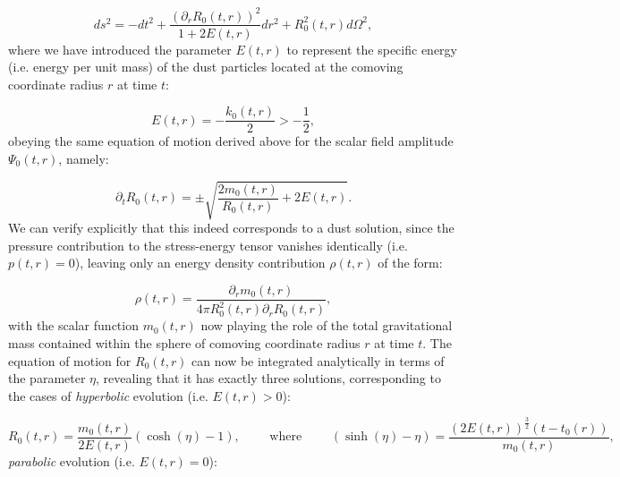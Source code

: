 \documentclass{article}
\begin{document}
\begin{equation}
d s^2 = - dt^2 + \frac{\left( \partial_r R_0 \left( t, r \right) \right)^2}{1 + 2 E \left( t, r \right)} dr^2 + R_{0}^{2} \left( t, r \right) d \Omega^2,
\end{equation}
where we have introduced the parameter ${E \left( t, r \right)}$ to represent the specific energy (i.e. energy per unit mass) of the dust particles located at the comoving coordinate radius $r$ at time $t$:

\begin{equation}
E \left( t, r \right) = - \frac{k_0 \left( t, r \right)}{2} > - \frac{1}{2},
\end{equation}
obeying the same equation of motion derived above for the scalar field amplitude ${\Psi_0 \left( t, r \right)}$, namely:

\begin{equation}
\partial_t R_{0} \left( t, r \right) = \pm \sqrt{ \frac{2 m_0 \left( t, r \right)}{R_0 \left( t, r \right)} + 2 E \left( t, r \right)}.
\end{equation}
We can verify explicitly that this indeed corresponds to a dust solution, since the pressure contribution to the stress-energy tensor vanishes identically (i.e. ${p \left( t, r \right) = 0}$), leaving only an energy density contribution ${\rho \left( t, r \right)}$ of the form:

\begin{equation}
\rho \left( t, r \right) = \frac{\partial_r m_0 \left( t, r \right)}{4 \pi R_{0}^{2} \left( t, r \right) \partial_r R_0 \left( t, r \right)},
\end{equation}
with the scalar function ${m_0 \left( t, r \right)}$ now playing the role of the total gravitational mass contained within the sphere of comoving coordinate radius $r$ at time $t$. The equation of motion for ${R_0 \left( t, r \right)}$ can now be integrated analytically in terms of the parameter ${\eta}$, revealing that it has exactly three solutions, corresponding to the cases of \textit{hyperbolic} evolution (i.e. ${E \left( t, r \right) > 0}$):

\begin{equation}
R_0 \left( t, r \right) = \frac{m_0 \left( t, r \right)}{2 E \left( t, r \right)} \left( \cosh \left( \eta \right) - 1 \right), \qquad \text{ where } \qquad \left( \sinh \left( \eta \right) - \eta \right) = \frac{\left( 2 E \left( t, r \right) \right)^{\frac{3}{2}} \left( t - t_0 \left( r \right) \right)}{m_0 \left( t, r \right)},
\end{equation}
\textit{parabolic} evolution (i.e. ${E \left( t, r \right) = 0}$):
\end{document}
